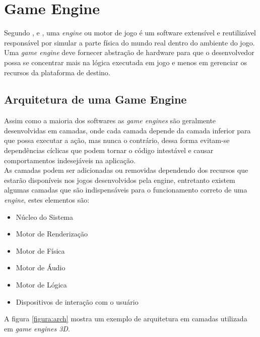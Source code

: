 \documentclass[12pt,	openright, twoside,	a4paper, english, french, spanish, brazil]{abntex2}
\begin{document}
\chapter{Game Engine} \label{cap: gameEngine}

%
%

Segundo ,  e , uma \textit{engine} ou motor de jogo é um software extensível e reutilizável responsável por simular a parte física do mundo real dentro do ambiente do jogo. Uma \textit{game engine} deve fornecer abstração de hardware para que o desenvolvedor possa se concentrar mais na lógica executada em jogo e menos em gerenciar os recursos da plataforma de destino.

%
%

\section{Arquitetura de uma Game Engine}
Assim como a maioria dos softwares as \textit{game engines} são geralmente desenvolvidas em camadas, onde cada camada depende da camada inferior para que possa executar a ação, mas nunca o contrário, dessa forma evitam-se dependências cíclicas que podem tornar o código intestável e causar comportamentos indesejáveis na aplicação. \\
As camadas podem ser adicionadas ou removidas dependendo dos recursos que estarão disponíveis nos jogos desenvolvidos pela engine, entretanto existem algumas camadas que são indispensáveis para o funcionamento correto de uma \textit{engine}, estes elementos são:

\begin{itemize}
\item Núcleo do Sistema
\item Motor de Renderização
\item Motor de Física
\item Motor de Áudio
\item Motor de Lógica
\item Dispositivos de interação com o usuário
\end{itemize}

 A  figura \ref{figura:arch} mostra um exemplo de arquitetura em camadas utilizada em \textit{game engines 3D}.
\end{document}

